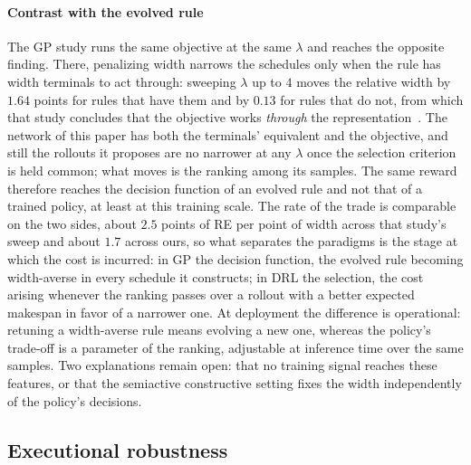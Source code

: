 \documentclass[preprint,authoryear,12pt]{elsarticle}
\theoremstyle{definition}
\theoremstyle{remark}
\begin{document}
\paragraph{Contrast with the evolved rule} The GP study runs
the same objective at the same $\lambda$ and reaches the opposite
finding. There, penalizing width narrows the schedules only when the
rule has width terminals to act through: sweeping $\lambda$ up to $4$
moves the relative width by $1.64$ points for rules that have
them and by $0.13$ for rules that do not, from which that study
concludes that the objective works \emph{through} the
representation~\citep{DiazGP2026}. The network of this paper has
both the terminals' equivalent and the objective, and still the
rollouts it proposes are no narrower at any $\lambda$ once the
selection criterion is held common; what moves is the ranking among
its samples. The same reward therefore reaches the decision
function of an evolved rule and not that of a trained policy, at
least at this training scale. The rate of the trade is comparable on
the two sides, about $2.5$ points of RE per point of width across
that study's sweep and about $1.7$ across ours, so what separates
the paradigms is the stage at which the cost is incurred: in GP the
decision function, the evolved rule becoming width-averse in every
schedule it constructs; in DRL the selection, the cost arising
whenever the ranking passes over a rollout with a better expected
makespan in favor of a narrower one. At deployment the difference is
operational: retuning a width-averse rule means evolving a new one,
whereas the policy's trade-off is a parameter of the ranking,
adjustable at inference time over the same samples. Two explanations
remain open: that no training signal reaches these features, or that
the semiactive constructive setting fixes the width independently of
the policy's decisions.

\FloatBarrier
\subsection{Executional robustness}
\label{sec:results-eps}
\end{document}
